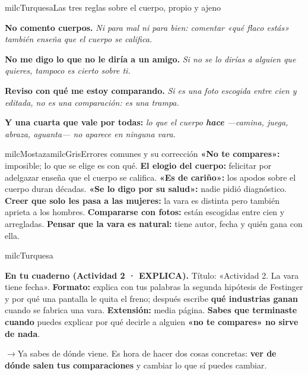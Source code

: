 \documentclass[11pt,letterpaper]{article}
\newcommand{\puente}[1]{%
  \begin{puentebox}%
    \textcolor{milcGradeDark}{$\rightarrow$}\hspace{2mm}#1%
  \end{puentebox}%
}
\begin{document}
\begin{drawbox}{milcTurquesa}{Las tres reglas sobre el cuerpo, propio y ajeno}
\begin{pasoslista}
\item \textbf{No comento cuerpos.} \emph{Ni para mal ni para bien: comentar «qué flaco estás» también enseña que el cuerpo se califica.}
\item \textbf{No me digo lo que no le diría a un amigo.} \emph{Si no se lo dirías a alguien que quieres, tampoco es cierto sobre ti.}
\item \textbf{Reviso con qué me estoy comparando.} \emph{Si es una foto escogida entre cien y editada, no es una comparación: es una trampa.}
\item \textbf{Y una cuarta que vale por todas:} \emph{lo que el cuerpo \textbf{hace} ---camina, juega, abraza, aguanta--- no aparece en ninguna vara.}
\end{pasoslista}
\end{drawbox}

\begin{softbox}{milcMostaza}{milcGris}{Errores comunes y su corrección}
\textbf{«No te compares»:} imposible; lo que se elige es con qué. \textbf{El elogio del cuerpo:} felicitar por adelgazar enseña que el cuerpo se califica. \textbf{«Es de cariño»:} los apodos sobre el cuerpo duran décadas. \textbf{«Se lo digo por su salud»:} nadie pidió diagnóstico. \textbf{Creer que solo les pasa a las mujeres:} la vara es distinta pero también aprieta a los hombres. \textbf{Compararse con fotos:} están escogidas entre cien y arregladas. \textbf{Pensar que la vara es natural:} tiene autor, fecha y quién gana con ella.
\end{softbox}

\begin{infoband}{milcTurquesa}


\textbf{En tu cuaderno (Actividad 2 · EXPLICA).} Título: «Actividad 2. La vara tiene fecha». \textbf{Formato:} explica con tus palabras la segunda hipótesis de Festinger y por qué una pantalla le quita el freno; después escribe \textbf{qué industrias ganan} cuando se fabrica una vara. \textbf{Extensión:} media página. \textbf{Sabes que terminaste cuando} puedes explicar por qué decirle a alguien \textbf{«no te compares» no sirve de nada}.
\end{infoband}

\puente{Ya sabes de dónde viene. Es hora de hacer dos cosas concretas: \textbf{ver de dónde salen tus comparaciones} y cambiar lo que sí puedes cambiar.}
\end{document}
